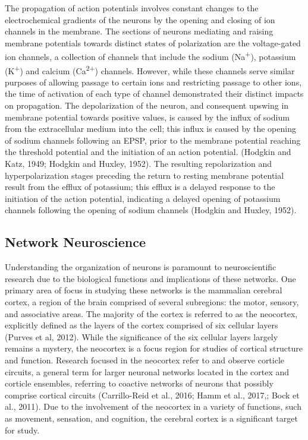 \documentclass[11pt]{article}
\begin{document}
The propagation of action potentials involves constant changes to the electrochemical gradients of the neurons by the opening and closing of ion channels in the membrane. The sections of neurons mediating and raising membrane potentials towards distinct states of polarization are the voltage-gated ion channels, a collection of channels that include the sodium (Na\textsuperscript{+}), potassium (K\textsuperscript{+}) and calcium (Ca\textsuperscript{2+}) channels. However, while these channels serve similar purposes of allowing passage to certain ions and restricting passage to other ions, the time of activation of each type of channel demonstrated their distinct impacts on propagation. The depolarization of the neuron, and consequent upswing in membrane potential towards positive values, is caused by the influx of sodium from the extracellular medium into the cell; this influx is caused by the opening of sodium channels following an EPSP, prior to the membrane potential reaching the threshold potential and the initiation of an action potential. (Hodgkin and Katz, 1949; Hodgkin and Huxley, 1952). The resulting repolarization and hyperpolarization stages preceding the return to resting membrane potential result from the efflux of potassium; this efflux is a delayed response to the initiation of the action potential, indicating a delayed opening of potassium channels following the opening of sodium channels (Hodgkin and Huxley, 1952).

\subsection{Network Neuroscience}
Understanding the organization of neurons is paramount to neuroscientific research due to the biological functions and implications of these networks. One primary area of focus in studying these networks is the mammalian cerebral cortex, a region of the brain comprised of several subregions: the motor, sensory, and associative areas. The majority of the cortex is referred to as the neocortex, explicitly defined as the layers of the cortex comprised of six cellular layers (Purves et al, 2012). While the significance of the six cellular layers largely remains a mystery, the neocortex is a focus region for studies of cortical structure and function. Research focused in the neocortex refer to and observe corticle circuits, a general term for larger neuronal networks located in the cortex and corticle ensembles, referring to coactive networks of neurons that possibly comprise cortical circuits (Carrillo-Reid et al., 2016; Hamm et al., 2017,; Bock et al., 2011). Due to the involvement of the neocortex in a variety of functions, such as movement, sensation, and cognition, the cerebral cortex is a significant target for study.\par
\end{document}
